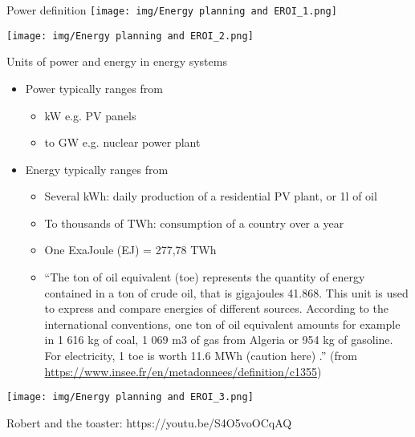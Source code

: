 \begin{frame}{Power definition}
\label{power-definition}
\texttt{[image: img/Energy planning and EROI\_1.png]}

\texttt{[image: img/Energy planning and EROI\_2.png]}
\end{frame}

\begin{frame}{Units of power and energy in energy systems}
\label{units-of-power-and-energy-in-energy-systems}
\begin{itemize}
\tightlist
\item
  Power typically ranges from

  \begin{itemize}
  \tightlist
  \item
    kW e.g. PV panels
  \item
    to GW e.g. nuclear power plant
  \end{itemize}
\item
  Energy typically ranges from

  \begin{itemize}
  \tightlist
  \item
    Several kWh: daily production of a residential PV plant, or 1l of
    oil
  \item
    To thousands of TWh: consumption of a country over a year
  \item
    One ExaJoule (EJ) = 277,78 TWh
  \item
    ``The ton of oil equivalent (toe) represents the quantity of energy
    contained in a ton of crude oil, that is gigajoules 41.868. This
    unit is used to express and compare energies of different sources.
    According to the international conventions, one ton of oil
    equivalent amounts for example in 1 616 kg of coal, 1 069 m3 of gas
    from Algeria or 954 kg of gasoline. For electricity, 1 toe is worth
    11.6 MWh {(caution here)} .'' (from
    \url{https://www.insee.fr/en/metadonnees/definition/c1355})
  \end{itemize}
\end{itemize}

\texttt{[image: img/Energy planning and EROI\_3.png]}
\end{frame}

\begin{frame}{Robert and the toaster: https://youtu.be/S4O5voOCqAQ}
\label{robert-and-the-toaster-httpsyoutu.bes4o5voocqaq}
\end{frame}

